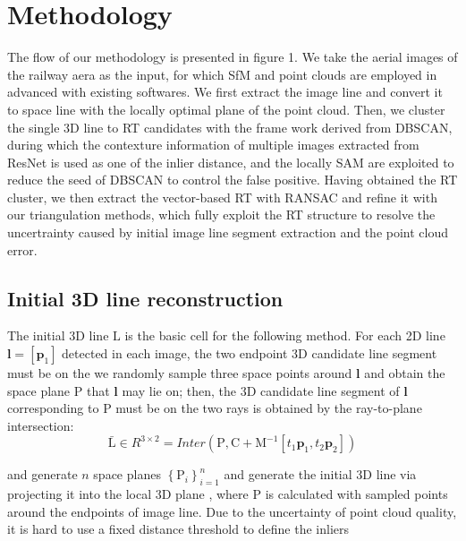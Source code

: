 \section{Methodology}

The flow of our methodology is presented in figure 1.
We take the aerial images of the railway aera as the input,
for which SfM and point clouds are employed in advanced with existing softwares.
We first extract the image line and convert it to space line with the locally optimal plane of the point cloud.
Then,
we cluster the single 3D line to RT candidates with the frame work derived from DBSCAN,  
during which the contexture information of multiple images extracted from ResNet is used as one of the inlier distance,
and the locally SAM are exploited to reduce the seed of DBSCAN to control the false positive.
Having obtained the RT cluster, we then extract the vector-based RT with RANSAC and refine it with our triangulation methods,
which fully exploit the RT structure to resolve the uncertrainty caused by initial image line segment extraction and the point cloud error.

\subsection{Initial 3D line reconstruction}

The initial 3D line $\mathrm{L}$ is the basic cell for the following method.
For each 2D line $\mathbf l=[\mathbf p_1]$ detected in each image,
the two endpoint 3D candidate line segment must be on the 
we randomly sample three space points around $\mathbf l$ and obtain the space plane $\mathrm P$ that $\mathbf l$ may lie on;
then, 
the 3D candidate line segment of $\mathbf l$ corresponding to $\mathrm P$  must be on the two rays is obtained by the ray-to-plane intersection:
\begin{equation}
    \bar{\mathrm L}\in R^{3\times2}=\textit{Inter} \left(\mathrm P, \mathrm C+\mathrm M^{-1} \left[t_1 \mathbf p_1, t_2 \mathbf p_2 \right] \right) 
\end{equation}



and generate $n$ space planes $\left\{ \mathrm{P}_i\right\}_{i=1}^n$ 
and generate the initial 3D line via projecting it into the local 3D plane ,
where {P} is calculated with sampled points around the endpoints of image line.
Due to the uncertainty of point cloud quality,
it is hard to use a fixed distance threshold to define the inliers










